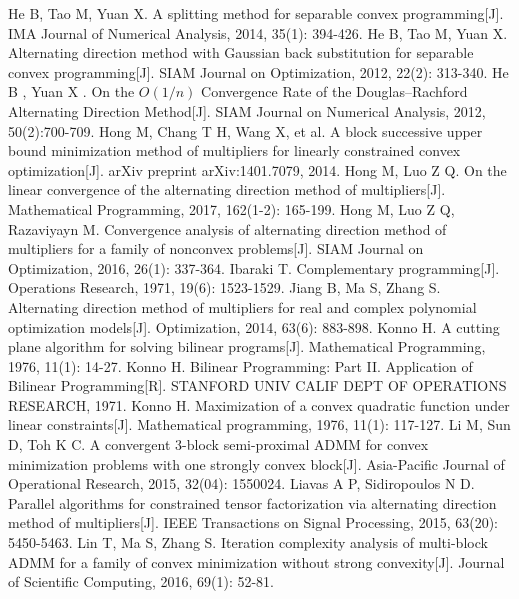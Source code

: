 \documentclass[UTF8,10.5pt,a4paper]{ctexart}
\theoremstyle{definition}
\theoremstyle{definition}
\begin{document}
\begin{thebibliography}{MM}
\begin{small}
		He B, Tao M, Yuan X. A splitting method for separable convex programming[J]. IMA Journal of Numerical Analysis, 2014, 35(1): 394-426.
		 He B, Tao M, Yuan X. Alternating direction method with Gaussian back substitution for separable convex programming[J]. SIAM Journal on Optimization, 2012, 22(2): 313-340.
		 He B , Yuan X . On the $O(1/n)$ Convergence Rate of the Douglas–Rachford Alternating Direction Method[J]. SIAM Journal on Numerical Analysis, 2012, 50(2):700-709.
		 Hong M, Chang T H, Wang X, et al. A block successive upper bound minimization method of multipliers for linearly constrained convex optimization[J]. arXiv preprint arXiv:1401.7079, 2014.
		 Hong M, Luo Z Q. On the linear convergence of the alternating direction method of multipliers[J]. Mathematical Programming, 2017, 162(1-2): 165-199.
		 Hong M, Luo Z Q, Razaviyayn M. Convergence analysis of alternating direction method of multipliers for a family of nonconvex problems[J]. SIAM Journal on Optimization, 2016, 26(1): 337-364.
		 Ibaraki T. Complementary programming[J]. Operations Research, 1971, 19(6): 1523-1529.
		 Jiang B, Ma S, Zhang S. Alternating direction method of multipliers for real and complex polynomial optimization models[J]. Optimization, 2014, 63(6): 883-898.
		 Konno H. A cutting plane algorithm for solving bilinear programs[J]. Mathematical Programming, 1976, 11(1): 14-27.
		 Konno H. Bilinear Programming: Part II. Application of Bilinear Programming[R]. STANFORD UNIV CALIF DEPT OF OPERATIONS RESEARCH, 1971.
		 Konno H. Maximization of a convex quadratic function under linear constraints[J]. Mathematical programming, 1976, 11(1): 117-127.
		 Li M, Sun D, Toh K C. A convergent 3-block semi-proximal ADMM for convex minimization problems with one strongly convex block[J]. Asia-Pacific Journal of Operational Research, 2015, 32(04): 1550024.
		 Liavas A P, Sidiropoulos N D. Parallel algorithms for constrained tensor factorization via alternating direction method of multipliers[J]. IEEE Transactions on Signal Processing, 2015, 63(20): 5450-5463.
		 Lin T, Ma S, Zhang S. Iteration complexity analysis of multi-block ADMM for a family of convex minimization without strong convexity[J]. Journal of Scientific Computing, 2016, 69(1): 52-81.

\end{small}
\end{thebibliography}
\end{document}
